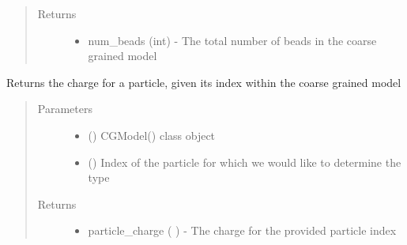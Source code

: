 \documentclass[letterpaper,12pt,english,openany,oneside]{sphinxmanual}
\begin{document}
\begin{fulllineitems}
\begin{fulllineitems}
\begin{quote}
\begin{description}
\item[{Returns}] \leavevmode
\begin{itemize}
\item {} 
num\_beads (int) - The total number of beads in the coarse grained model

\end{itemize}


\end{description}\end{quote}

\end{fulllineitems}


\begin{fulllineitems}
\label{\detokenize{cg_model:cg_model.cgmodel.CGModel.get_particle_charge}}
Returns the charge for a particle, given its index within the coarse grained model
\begin{quote}\begin{description}
\item[{Parameters}] \leavevmode\begin{itemize}
\item {} 
 () \textendash{} CGModel() class object

\item {} 
 () \textendash{} Index of the particle for which we would like to determine the type

\end{itemize}

\item[{Returns}] \leavevmode
\begin{itemize}
\item {} 
particle\_charge (  ) - The charge for the provided particle index

\end{itemize}


\end{description}\end{quote}


\end{fulllineitems}
\end{fulllineitems}
\end{document}
